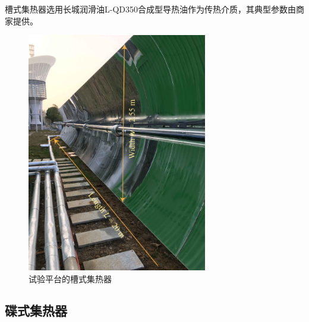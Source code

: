 槽式集热器选用长城润滑油L-QD350合成型导热油作为传热介质，其典型参数由商家提供。

\begin{figure}[!ht]
\centering
\includegraphics[width=0.7\textwidth]{fig/TroughCollector.jpg}
\caption{试验平台的槽式集热器}
\label{fig:TroughCollector}
\end{figure}

\subsection{碟式集热器}

